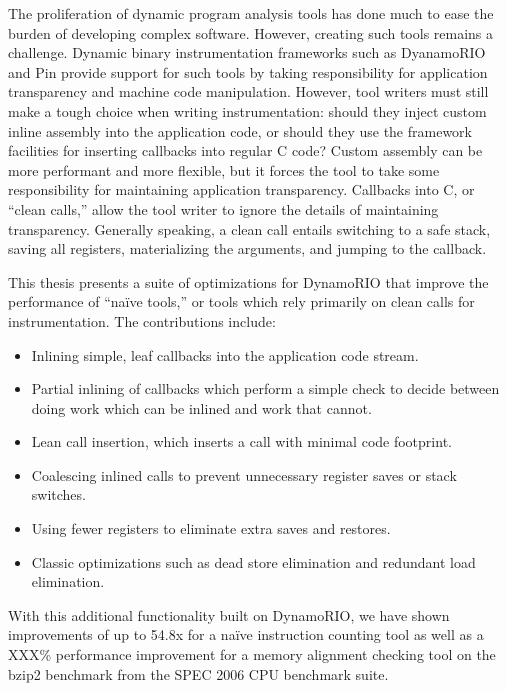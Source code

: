 \begin{abstractpage}

The proliferation of dynamic program analysis tools has done much to ease the
burden of developing complex software.  However, creating such tools remains a
challenge.  Dynamic binary instrumentation frameworks such as DyanamoRIO and
Pin provide support for such tools by taking responsibility for application
transparency and machine code manipulation.  However, tool writers must still
make a tough choice when writing instrumentation: should they inject custom
inline assembly into the application code, or should they use the framework
facilities for inserting callbacks into regular C code?  Custom assembly can be
more performant and more flexible, but it forces the tool to take some
responsibility for maintaining application transparency.  Callbacks into C, or
``clean calls,'' allow the tool writer to ignore the details of maintaining
transparency.  Generally speaking, a clean call entails switching to a safe
stack, saving all registers, materializing the arguments, and jumping to the
callback.


This thesis presents a suite of optimizations for DynamoRIO that improve the
performance of ``na\"ive tools,'' or tools which rely primarily on clean calls
for instrumentation.  The contributions include:

\begin{itemize}
\item Inlining simple, leaf callbacks into the application code stream.
\item Partial inlining of callbacks which perform a simple check to decide
between doing work which can be inlined and work that cannot.
\item Lean call insertion, which inserts a call with minimal code footprint.
\item Coalescing inlined calls to prevent unnecessary register saves or stack
switches.
\item Using fewer registers to eliminate extra saves and restores.
\item Classic optimizations such as dead store elimination and redundant load
elimination.
\end{itemize}

With this additional functionality built on DynamoRIO, we have shown
improvements of up to 54.8x for a na\"ive instruction counting tool as well as
a XXX\% performance improvement for a memory alignment checking tool on the
bzip2 benchmark from the SPEC 2006 CPU benchmark suite.

\end{abstractpage}

